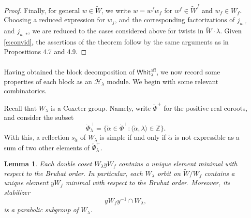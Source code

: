 \documentclass[11pt,reqno]{amsart}
\newcommand{\sH}{\mathscr{H}}
\newcommand{\aff}{\operatorname{aff}}
\newcommand{\fL}{\mathfrak{L}}
\newcommand{\halpha}{\check{\alpha}}
\newtheorem{lem}[subsubsection]{Lemma}
\theoremstyle{remark}
\numberwithin{equation}{section}
\newcommand{\Whit}{\mathsf{Whit}}
\begin{document}
\begin{proof}
	
	
	Finally, for general $w \in \widetilde{W}$, we write
	$w = w^f w_f$ for $w^f \in \widetilde{W}^f$ and $w_f \in W_f$. 
	Choosing a 
	reduced expression for $w_f$, and the corresponding factorizations of 
	$j_{w, !}$ and $j_{w, *}$, we are reduced to the
	cases considered above for twists in $\widetilde{W} \cdot \lambda$. Given 
	\eqref{e:convid}, the assertions of the theorem follow by 
	the same arguments as in \cite{ly} Propositions 4.7 and 4.9. 
\end{proof}

%
%

\subsubsection{} Having obtained the block decomposition of 
$\Whit_{\lambda}^{\aff}$, we now record some properties of each block as an 
$\sH_\lambda$ module. We begin with some relevant combinatorics.

 Recall that 
$W_\lambda$ is a Coxeter group. Namely, write 
$\check{\Phi}^+$ for 
the positive real coroots, and consider the subset
%
\[\check{\Phi}^+_\lambda = \{ \halpha \in \check{\Phi}^+: \langle \halpha, 
\lambda \rangle \in \mathbb{Z} \}.
\] 
%
With this, a reflection $s_{\halpha}$ of $W_\lambda$ is simple if and only if 
$\halpha$ is not expressible as a 
sum of two other elements of $\check{\Phi}^+_\lambda$.


\begin{lem} \label{l:dcs}Each double coset $W_\lambda y {W}_{f}$ 
	contains a unique element minimal with
	respect to the Bruhat order.  In particular, each $W_\lambda$ 
	orbit on $\widetilde{W} / W_{f}$ contains a 
	unique element $yW_f$ minimal with respect to the Bruhat order. Moreover, 
	its stabilizer   
	\begin{equation}  y W_f y^{-1} \cap W_\lambda,\label{e:parsubgp}
	\end{equation}
	is a parabolic subgroup of $W_\lambda$. 
\end{lem} 
\end{document}
